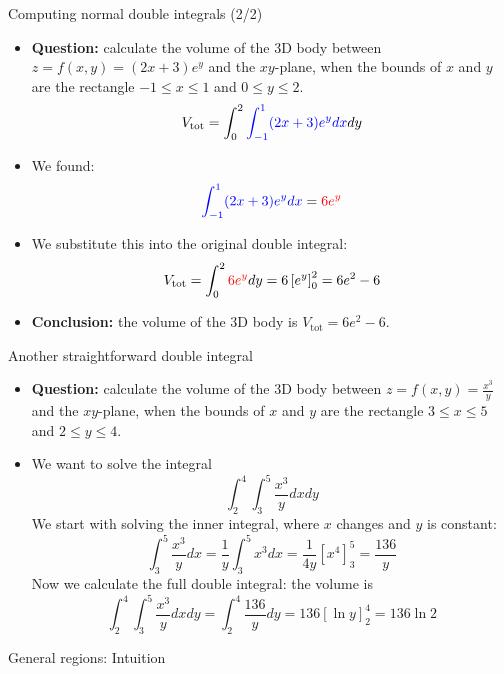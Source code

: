 \begin{frame}{Computing normal double integrals (2/2)}
    \begin{itemize}
        \item \textbf{Question:} calculate the volume of the 3D body between $z=f(x,y)=(2x+3)e^y$ and the $xy$-plane, when the bounds of $x$ and $y$ are the rectangle $-1\leq x\leq1$ and $0\leq y\leq2$.
            \[V_{\text{tot}}=\int_{0}^{2}\textcolor{blue}{\int_{-1}^{1}(2x+3)e^y dx}dy\]
        \item\pause We found:
            \[\textcolor{blue}{\int_{-1}^{1}(2x+3)e^y dx}=\textcolor{red}{6e^y}\]
        \item\pause We substitute this into the original double integral:
            \[V_{\text{tot}}=\int_{0}^{2}\textcolor{red}{6e^y}dy=6\left[e^y\right]_0^2=6e^2-6\]
        \item\pause \textbf{Conclusion:} the volume of the 3D body is $\boxed{V_{\text{tot}}=6e^2-6}$.
    \end{itemize}
\end{frame}


\begin{frame}{Another straightforward double integral}
    \begin{itemize}
        \item \textbf{Question:} calculate the volume of the 3D body between $z=f(x,y)=\frac{x^3}{y}$ and the $xy$-plane, when the bounds of $x$ and $y$ are the rectangle $3\leq x\leq5$ and $2\leq y\leq4$.
        \item\pause We want to solve the integral
            \[\int_2^4\int_3^5\frac{x^3}{y}dxdy\]
            We start with solving the inner integral, where $x$ changes and $y$ is constant:
            \[\int_3^5\frac{x^3}{y}dx=\frac{1}{y}\int_3^5x^3dx=\frac{1}{4y}\left[x^4\right]_3^5=\frac{136}{y}\]
            \pause Now we calculate the full double integral: the volume is
            \[\int_2^4\int_3^5\frac{x^3}{y}dxdy=\int_2^4\frac{136}{y}dy=136\left[\ln y\right]_2^4=\boxed{136\ln2}\]
    \end{itemize}
\end{frame}

\begin{frame}{General regions: Intuition}
    

\end{frame}

